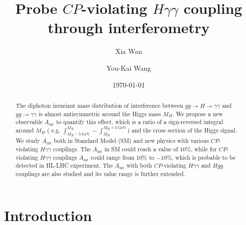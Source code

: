 \documentclass[twocolumn,
prd,amssymb,amsmath,preprintnumbers,
floatfix,aps,nofootinbib]{revtex4-1}
\begin{document}
\title{ Probe $CP$-violating $H\gamma\gamma$ coupling through interferometry}

\author{Xia Wan}

\author{You-Kai Wang}


\date{\today}

\begin{abstract}

The diphoton invariant mass distribution of interference between
 $gg\to H \to \gamma\gamma$ and $gg\to \gamma\gamma$
is almost antisymmetric around the Higgs mass $M_H$. We propose
a new observable $A_{\text{int}}$ to quantify this effect, which is a ratio of
a sign-reversed integral around $M_H$ ( e.g. $\int^{M_H}_{M_H-5~\mbox{GeV}}
-\int_{M_H}^{M_H+5~\mbox{GeV}}$) and the cross section of the
Higgs signal.
We study $A_{\text{int}}$ both in Standard Model (SM) and new physics with various $CP$-violating
$H\gamma\gamma$ couplings.
The $A_{\text{int}}$ in SM
 could reach a value of $10\%$,
while for $CP$-violating $H\gamma\gamma$ couplings
$A_{\text{int}}$ could range from $10\%$ to $-10\%$,
which is probable to be detected in HL-LHC experiment.
The $A_{\text{int}}$ with both $CP$-violating $H\gamma\gamma$ and $Hgg$ couplings are
also studied and its value range is further extended.

\end{abstract}


\maketitle

\section{Introduction\label{Introduction}}
\end{document}
